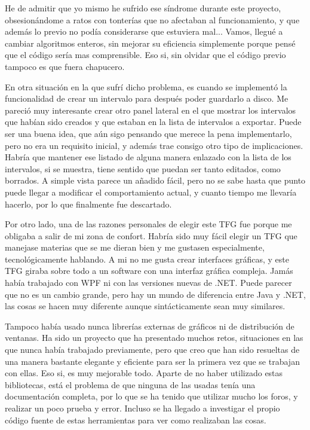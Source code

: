 He de admitir que yo mismo he sufrido ese s\'indrome durante este proyecto, 
obsesion\'andome a ratos con tonter\'ias que no afectaban al funcionamiento, y 
que adem\'as lo previo no pod\'ia considerarse que estuviera mal... Vamos, 
llegu\'e a cambiar algoritmos enteros, sin mejorar su eficiencia simplemente 
porque pens\'e que el 
c\'odigo ser\'ia mas comprensible. Eso si, sin olvidar que el c\'odigo previo 
tampoco es que fuera chapucero.

En otra situaci\'on en la que sufr\'i dicho problema, es cuando se implement\'o 
la funcionalidad de crear un intervalo para despu\'es poder guardarlo a disco. 
Me pareci\'o muy interesante crear otro panel lateral en el que mostrar los 
intervalos que hab\'ian sido creados y que estaban en la lista de intervalos a 
exportar. Puede ser una buena idea, que a\'un sigo pensando
que merece la pena implementarlo, pero no era un requisito inicial, y adem\'as 
trae consigo otro tipo de implicaciones. Habr\'ia que mantener ese listado de 
alguna manera enlazado con la lista de los intervalos, si se muestra, tiene 
sentido
que puedan ser tanto editados, como borrados. A simple vista parece un a\~nadido f\'acil, pero no se sabe hasta que punto
puede llegar a modificar el comportamiento actual, y cuanto tiempo me llevar\'ia hacerlo, por lo que finalmente
fue descartado.

Por otro lado, una de las razones personales de elegir este TFG fue porque me obligaba a salir de mi zona
de confort. Habr\'ia sido muy f\'acil elegir un TFG que manejase materias que se me dieran bien
y me gustasen especialmente, tecnol\'ogicamente hablando. A mi no me gusta crear interfaces gr\'aficas,
y este TFG giraba sobre todo a un software con una interfaz gr\'afica compleja. Jam\'as hab\'ia trabajado
con WPF ni con las versiones nuevas de .NET. Puede parecer que no es un cambio 
grande, pero hay un mundo de
diferencia entre Java y .NET, las cosas se hacen muy diferente aunque sint\'acticamente sean muy similares.

Tampoco hab\'ia usado nunca librer\'ias externas de gr\'aficos ni de distribuci\'on de ventanas. Ha sido
un proyecto que ha presentado muchos retos, situaciones en las que nunca hab\'ia trabajado previamente,
pero que creo que han sido resueltas de una manera bastante elegante y eficiente para ser
la primera vez que se trabajan con ellas. Eso si, es muy mejorable todo. Aparte
de no haber utilizado estas bibliotecas, est\'a el problema de que ninguna de las usadas
ten\'ia una documentaci\'on completa, por lo que se ha tenido que utilizar mucho los foros,
y realizar un poco prueba y error. Incluso se ha llegado a investigar el propio 
c\'odigo
fuente de estas herramientas para ver como realizaban las cosas.

